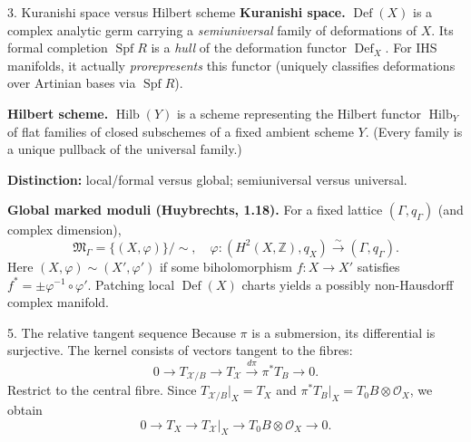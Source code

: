\documentclass[aspectratio=169]{beamer}
\begin{document}
\begin{frame}{3. Kuranishi space versus Hilbert scheme}
\small
\textbf{Kuranishi space.}
$\operatorname{Def}(X)$ is a complex analytic germ carrying a
\emph{semiuniversal} family of deformations of $X$.
Its formal completion $\operatorname{Spf}R$ is a
\emph{hull} of the deformation functor $\operatorname{Def}_X$.
For IHS manifolds, it actually \emph{prorepresents} this functor
(uniquely classifies deformations over Artinian bases via $\operatorname{Spf}R$).

\medskip
\textbf{Hilbert scheme.}
$\operatorname{Hilb}(Y)$ is a scheme representing the Hilbert
functor $\operatorname{Hilb}_Y$ of flat families of closed
subschemes of a fixed ambient scheme $Y$.
(Every family is a unique pullback of the universal family.)

\medskip
\textbf{Distinction:} local/formal versus global;
semiuniversal versus universal.

\medskip
\textbf{Global marked moduli (Huybrechts, 1.18).}
For a fixed lattice $(\Gamma,q_\Gamma)$ (and complex dimension),
\[
\mathfrak M_\Gamma
=\{(X,\varphi)\}/\!\sim,\quad
\varphi:(H^2(X,\mathbb Z),q_X)\xrightarrow{\sim}(\Gamma,q_\Gamma).
\]
Here $(X,\varphi)\sim(X',\varphi')$ if some biholomorphism
$f:X\to X'$ satisfies $f^*=\pm\varphi^{-1}\circ\varphi'$.
Patching local $\operatorname{Def}(X)$ charts yields a
possibly non-Hausdorff complex manifold.
\end{frame}

\begin{frame}{5. The relative tangent sequence}
Because $\pi$ is a submersion, its differential is surjective.
The kernel consists of vectors tangent to the fibres:
\[
0\longrightarrow T_{\mathcal X/B}
\longrightarrow T_{\mathcal X}
\xrightarrow{d\pi}\pi^*T_B\longrightarrow0.
\]
Restrict to the central fibre. Since
$T_{\mathcal X/B}|_X=T_X$ and
$\pi^*T_B|_X=T_0B\otimes\mathcal O_X$, we obtain
\[
\boxed{0\longrightarrow T_X\longrightarrow
T_{\mathcal X}|_X\longrightarrow
T_0B\otimes\mathcal O_X\longrightarrow0.}
\]
\end{frame}
\end{document}

